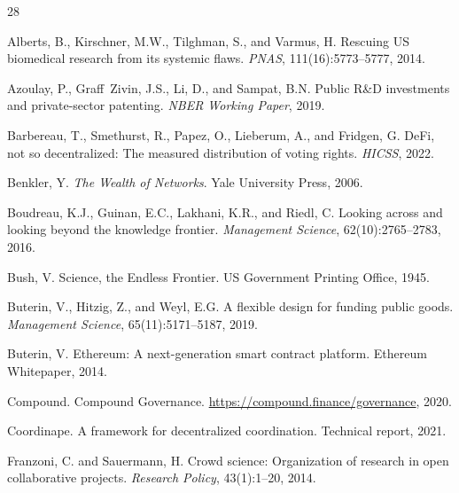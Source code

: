 \begin{thebibliography}{28}

Alberts, B., Kirschner, M.W., Tilghman, S., and Varmus, H.
\newblock Rescuing US biomedical research from its systemic flaws.
\newblock \emph{PNAS}, 111(16):5773--5777, 2014.

Azoulay, P., Graff~Zivin, J.S., Li, D., and Sampat, B.N.
\newblock Public R\&D investments and private-sector patenting.
\newblock \emph{NBER Working Paper}, 2019.

Barbereau, T., Smethurst, R., Papez, O., Lieberum, A., and Fridgen, G.
\newblock DeFi, not so decentralized: The measured distribution of voting rights.
\newblock \emph{HICSS}, 2022.

Benkler, Y.
\newblock \emph{The Wealth of Networks}.
\newblock Yale University Press, 2006.

Boudreau, K.J., Guinan, E.C., Lakhani, K.R., and Riedl, C.
\newblock Looking across and looking beyond the knowledge frontier.
\newblock \emph{Management Science}, 62(10):2765--2783, 2016.

Bush, V.
\newblock Science, the Endless Frontier.
\newblock US Government Printing Office, 1945.

Buterin, V., Hitzig, Z., and Weyl, E.G.
\newblock A flexible design for funding public goods.
\newblock \emph{Management Science}, 65(11):5171--5187, 2019.

Buterin, V.
\newblock Ethereum: A next-generation smart contract platform.
\newblock Ethereum Whitepaper, 2014.

Compound.
\newblock Compound Governance.
\newblock \url{https://compound.finance/governance}, 2020.

Coordinape.
\newblock A framework for decentralized coordination.
\newblock Technical report, 2021.

Franzoni, C. and Sauermann, H.
\newblock Crowd science: Organization of research in open collaborative projects.
\newblock \emph{Research Policy}, 43(1):1--20, 2014.


\end{thebibliography}
